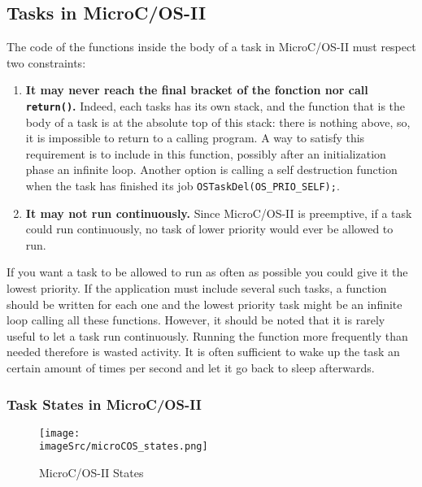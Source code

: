 \documentclass[../main.tex]{subfiles}
\begin{document}
\subsection{Tasks in MicroC/OS-II}
The code of the functions inside the body of a task in MicroC/OS-II must respect two constraints:
\begin{enumerate}
	\item \textbf{It may never reach the final bracket of the fonction nor call \texttt{return()}.} Indeed, each tasks has its own stack, and the function that is the body of a task is at the absolute top of this stack: there is nothing above, so, it is impossible to return to a calling program. A way to satisfy this requirement is to include in this function, possibly after an initialization phase an infinite loop. Another option is calling a self destruction function when the task has finished its job \texttt{OSTaskDel(OS\_PRIO\_SELF);}.
	\item \textbf{It may not run continuously.} Since  MicroC/OS-II is preemptive, if a task could run continuously, no task of lower priority would ever be allowed to run.
\end{enumerate}
If you want a task to be allowed to run as often as possible you could give it the lowest priority. If the application must include several such tasks, a function should be written for each one and the lowest priority task might be an infinite loop calling all these functions. However, it should be noted that it is rarely useful to let a task run continuously. Running the function more frequently than needed therefore is wasted activity. It is often sufficient to wake up the task an certain amount of times per second and let it go back to sleep afterwards.

\subsubsection{Task States in MicroC/OS-II}
\begin{figure}[H]
    \centering
    \texttt{[image: \\imageSrc/microCOS\_states.png]}
    \caption{MicroC/OS-II States}
    \label{mcosii}
\end{figure}
\end{document}

